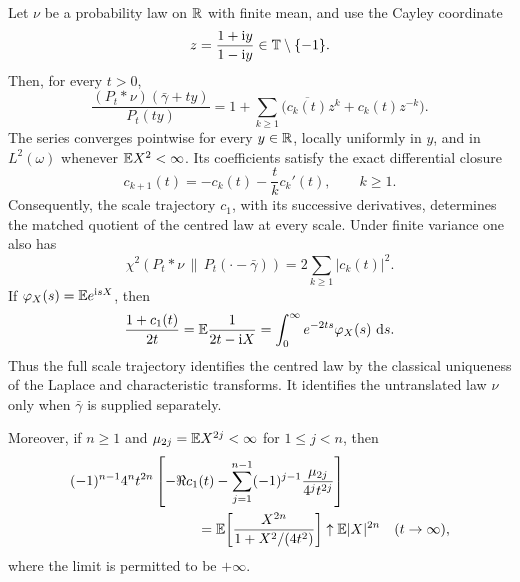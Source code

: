 \begin{theorem}
\label{thm:first-cayley-mode-closure}
Let \(\nu\) be a probability law on \(\mathbb{R}\) with finite mean, and use the
Cayley coordinate
\[
 z=\frac{1+\mathrm{i} y}{1-\mathrm{i} y}\in\mathbb{T}\setminus\{-1\}.
\]
Then, for every \(t>0\),
\begin{equation}\label{eq:first-channel-exact-fourier-series}
 \frac{(P_t*\nu)(\bar\gamma+ty)}{P_t(ty)}
 =1+\sum_{k\ge1}
 \bigl(\overline{c_k(t)}z^k+c_k(t)z^{-k}\bigr).
\end{equation}
The series converges pointwise for every \(y\in\mathbb{R}\), locally uniformly in
\(y\), and in \(L^2(\omega)\) whenever \(\mathbb{E} X^2<\infty\).  Its coefficients
satisfy the exact differential closure
\begin{equation}\label{eq:first-channel-differential-closure}
 c_{k+1}(t)=-c_k(t)-\frac{t}{k}c_k'(t),
 \qquad k\ge1.
\end{equation}
Consequently, the scale trajectory \(c_1\), with its successive derivatives,
determines the matched quotient of the centred law at every scale.  Under
finite variance one also has
\begin{equation}\label{eq:first-channel-chi-square-parseval}
 \chi^2\!\left(P_t*\nu\,\middle\|\,
 P_t(\mathord\cdot-\bar\gamma)\right)
 =2\sum_{k\ge1}|c_k(t)|^2.
\end{equation}
If \(\varphi_X(s)=\mathbb{E} e^{\mathrm{i} sX}\), then
\begin{equation}\label{eq:first-channel-laplace-resolvent}
 \frac{1+c_1(t)}{2t}
 =\mathbb{E}\frac1{2t-\mathrm{i} X}
 =\int_0^\infty e^{-2ts}\varphi_X(s)\,\,\mathrm{d} s.
\end{equation}
Thus the full scale trajectory identifies the centred law by the classical
uniqueness of the Laplace and characteristic transforms.  It identifies the
untranslated law \(\nu\) only when \(\bar\gamma\) is supplied separately.

Moreover, if \(n\ge1\) and \(\mu_{2j}=\mathbb{E} X^{2j}<\infty\) for
\(1\le j<n\), then
\begin{equation}\label{eq:first-channel-even-moment-remainder}
\begin{aligned}
 &(-1)^{n-1}4^nt^{2n}
 \left[-\Re c_1(t)-\sum_{j=1}^{n-1}
 (-1)^{j-1}\frac{\mu_{2j}}{4^jt^{2j}}\right]\\
 &\hspace{32mm}
 =\EE\!\left[\frac{X^{2n}}{1+X^2/(4t^2)}\right]
 \uparrow\EE|X|^{2n}
 \quad(t\to\infty),
\end{aligned}
\end{equation}
where the limit is permitted to be \(+\infty\).
\end{theorem}


